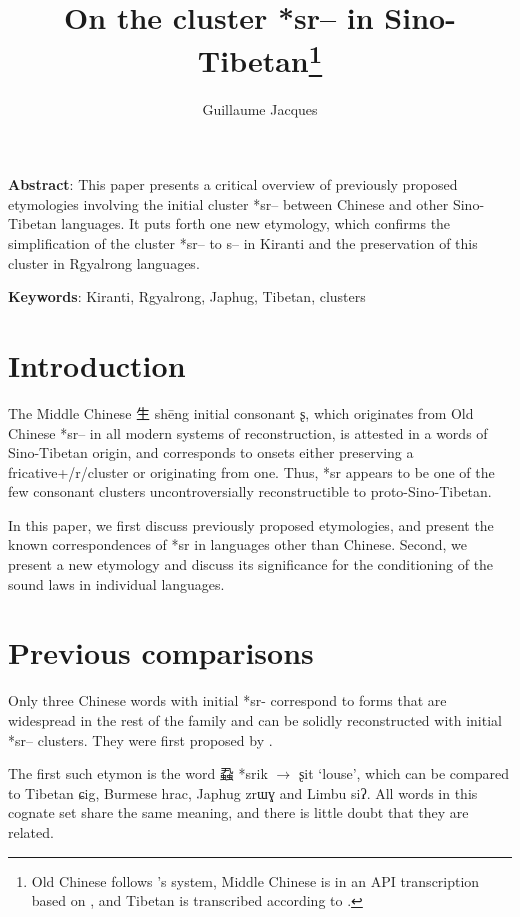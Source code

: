 \documentclass[oldfontcommands,oneside,a4paper,11pt]{article}
\newcommand{\ipa}[1]{{\phon #1}} %
\newcommand{\zh}[1]{{\cn #1}}
\newcommand{\archaic}[4]{\zh{#1} *\ipa{#2} $\rightarrow$ \ipa{#3} `#4'}
\begin{document}
 


\title{On the cluster *sr-- in Sino-Tibetan\footnote{Old Chinese follows \citealt{bs14oc}'s system, Middle Chinese is in an API transcription based on \citet{baxter92}, and Tibetan is transcribed according to \citet{jacques12transcription}.} %
}
\author{Guillaume Jacques}
\maketitle


\textbf{Abstract}: This paper presents a critical overview of previously proposed etymologies involving the initial cluster *\ipa{sr--} between Chinese and other Sino-Tibetan languages. It puts forth one new etymology, which confirms the simplification of the cluster *\ipa{sr--} to \ipa{s--} in Kiranti and the preservation of this cluster in Rgyalrong languages.


\textbf{Keywords}: Kiranti, Rgyalrong, Japhug, Tibetan, clusters


\section{Introduction}

The Middle Chinese \zh{生} shēng initial consonant \ipa{ʂ}, which originates from Old Chinese *\ipa{sr--} in all modern systems of reconstruction, is attested in a words of Sino-Tibetan origin, and corresponds to onsets either preserving a fricative+/r/cluster or originating from one. Thus, *\ipa{sr} appears to be  one of the few consonant clusters uncontroversially reconstructible to proto-Sino-Tibetan. 

In this paper, we first discuss previously proposed etymologies, and present the known correspondences of *\ipa{sr} in languages other than Chinese. Second, we present a new etymology and discuss its significance for the conditioning of the sound laws in individual languages.

\section{Previous comparisons} \label{sec:previous}
Only three Chinese words with initial *\ipa{sr-} correspond to forms that are widespread in the rest of the family and can be solidly reconstructed with initial *\ipa{sr--} clusters.  They were first proposed by \citet{benedict72}.

The first such etymon is the word \archaic{蝨}{srik}{ʂit}{louse}, which can be compared to Tibetan \ipa{ɕig}, Burmese \ipa{hrac}, Japhug \ipa{zrɯɣ} and Limbu \ipa{siʔ}. All words in this cognate set share the same meaning, and there is little doubt that they are related.
\end{document}
